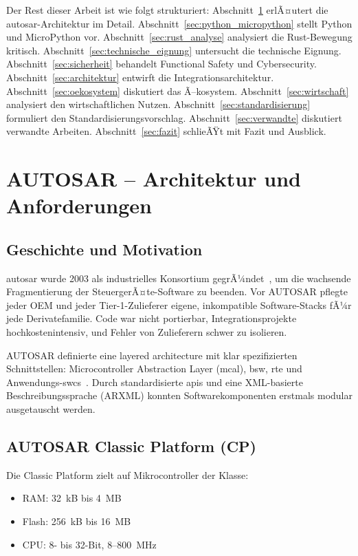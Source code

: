 ﻿\documentclass[12pt,a4paper,twoside]{article}
\begin{document}
Der Rest dieser Arbeit ist wie folgt strukturiert:
Abschnitt~\ref{sec:autosar} erlÃ¤utert die \gls{autosar}-Architektur im Detail.
Abschnitt~\ref{sec:python_micropython} stellt Python und MicroPython vor.
Abschnitt~\ref{sec:rust_analyse} analysiert die Rust-Bewegung kritisch.
Abschnitt~\ref{sec:technische_eignung} untersucht die technische Eignung.
Abschnitt~\ref{sec:sicherheit} behandelt Functional Safety und Cybersecurity.
Abschnitt~\ref{sec:architektur} entwirft die Integrationsarchitektur.
Abschnitt~\ref{sec:oekosystem} diskutiert das Ã–kosystem.
Abschnitt~\ref{sec:wirtschaft} analysiert den wirtschaftlichen Nutzen.
Abschnitt~\ref{sec:standardisierung} formuliert den Standardisierungsvorschlag.
Abschnitt~\ref{sec:verwandte} diskutiert verwandte Arbeiten.
Abschnitt~\ref{sec:fazit} schlieÃŸt mit Fazit und Ausblick.

\section{AUTOSAR -- Architektur und Anforderungen}
\label{sec:autosar}

\subsection{Geschichte und Motivation}
\gls{autosar} wurde 2003 als industrielles Konsortium gegrÃ¼ndet~\cite{autosar_overview2017},
um die wachsende Fragmentierung der SteuergerÃ¤te-Software zu beenden.
Vor AUTOSAR pflegte jeder OEM und jeder Tier-1-Zulieferer eigene,
inkompatible Software-Stacks fÃ¼r jede Derivatefamilie.
Code war nicht portierbar, Integrationsprojekte hochkostenintensiv,
und Fehler von Zulieferern schwer zu isolieren.

AUTOSAR definierte eine layered architecture mit klar spezifizierten
Schnittstellen: Microcontroller Abstraction Layer (\gls{mcal}),
\gls{bsw}, \gls{rte} und Anwendungs-\glspl{swc}~\cite{autosar_layered2016}.
Durch standardisierte \glspl{api} und eine XML-basierte Beschreibungssprache
(ARXML) konnten Softwarekomponenten erstmals modular ausgetauscht werden.

\subsection{AUTOSAR Classic Platform (CP)}
\label{subsec:cp}

Die Classic Platform zielt auf Mikrocontroller der Klasse:
\begin{itemize}
  \item RAM: 32~kB bis 4~MB
  \item Flash: 256~kB bis 16~MB
  \item CPU: 8- bis 32-Bit, 8--800~MHz
\end{itemize}
\end{document}
